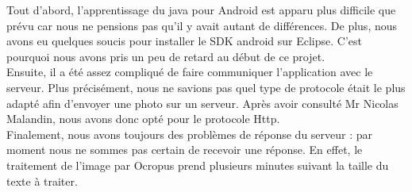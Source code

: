Tout d'abord, l'apprentissage du java pour Android est apparu plus difficile que prévu car nous ne pensions pas qu'il y avait autant de différences. De plus, nous avons eu quelques soucis pour installer le SDK android sur Eclipse. C'est pourquoi nous avons pris un peu de retard au début de ce projet.\\

Ensuite, il a été assez compliqué de faire communiquer l'application avec le serveur. Plus précisément, nous ne savions pas quel type de protocole était le plus adapté afin d'envoyer une photo sur un serveur. Après avoir consulté Mr Nicolas Malandin, nous avons donc opté pour le protocole Http.\\

Finalement, nous avons toujours des problèmes de réponse du serveur : par moment nous ne sommes pas certain de recevoir une réponse. En effet, le traitement de l'image par Ocropus prend plusieurs minutes suivant la taille du texte à traiter.